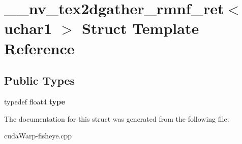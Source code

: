 \hypertarget{struct____nv__tex2dgather__rmnf__ret_3_01uchar1_01_4}{}\section{\+\_\+\+\_\+nv\+\_\+tex2dgather\+\_\+rmnf\+\_\+ret$<$ uchar1 $>$ Struct Template Reference}
\label{struct____nv__tex2dgather__rmnf__ret_3_01uchar1_01_4}
\subsection*{Public Types}
\begin{DoxyCompactItemize}
\item 
typedef float4 {\bfseries type}\hypertarget{struct____nv__tex2dgather__rmnf__ret_3_01uchar1_01_4_a80385a401f9e45e3f6b4a2b6a2c049c5}{}\label{struct____nv__tex2dgather__rmnf__ret_3_01uchar1_01_4_a80385a401f9e45e3f6b4a2b6a2c049c5}

\end{DoxyCompactItemize}


The documentation for this struct was generated from the following file\+:\begin{DoxyCompactItemize}
\item 
cuda\+Warp-\/fisheye.\+cpp\end{DoxyCompactItemize}
